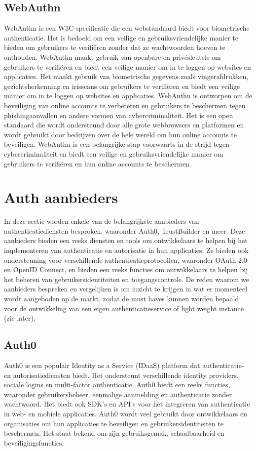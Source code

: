   \subsection{WebAuthn}%
  \label{subsec:webauthn}
  WebAuthn is een W3C-specificatie die een webstandaard biedt voor biometrische authenticatie. Het is bedoeld om een veilige en gebruiksvriendelijke manier te bieden om gebruikers te verifiëren zonder dat ze wachtwoorden hoeven te onthouden. WebAuthn maakt gebruik van openbare en privésleutels om gebruikers te verifiëren en biedt een veilige manier om in te loggen op websites en applicaties. Het maakt gebruik van biometrische gegevens zoals vingerafdrukken, gezichtsherkenning en irisscans om gebruikers te verifiëren en biedt een veilige manier om in te loggen op websites en applicaties. WebAuthn is ontworpen om de beveiliging van online accounts te verbeteren en gebruikers te beschermen tegen phishingaanvallen en andere vormen van cybercriminaliteit. Het is een open standaard die wordt ondersteund door alle grote webbrowsers en platformen en wordt gebruikt door bedrijven over de hele wereld om hun online accounts te beveiligen. WebAuthn is een belangrijke stap voorwaarts in de strijd tegen cybercriminaliteit en biedt een veilige en gebruiksvriendelijke manier om gebruikers te verifiëren en hun online accounts te beschermen.
  
  
  
  \section{Auth aanbieders}%
  \label{sec:auth-aanbieders}
  In deze sectie worden enkele van de belangrijkste aanbieders van authenticatiediensten besproken, waaronder Auth0, TrustBuilder en meer. Deze aanbieders bieden een reeks diensten en tools om ontwikkelaars te helpen bij het implementeren van authenticatie en autorisatie in hun applicaties. Ze bieden ook ondersteuning voor verschillende authenticatieprotocollen, waaronder OAuth 2.0 en OpenID Connect, en bieden een reeks functies om ontwikkelaars te helpen bij het beheren van gebruikersidentiteiten en toegangscontrole.
  De reden waarom we aanbieders bespreken en vergelijken is om inzicht te krijgen in wat er momenteel wordt aangeboden op de markt, zodat de must haves kunnen worden bepaald voor de ontwikkeling van een eigen authenticatieservice of light weight instance (zie later).
  
  
  \subsection{Auth0}%
  \label{subsec:auth0}
  Auth0 is een populair Identity as a Service (IDaaS) platform dat authenticatie- en autorisatiediensten biedt. Het ondersteunt verschillende identity providers, sociale logins en multi-factor authenticatie. Auth0 biedt een reeks functies, waaronder gebruikersbeheer, eenmalige aanmelding en authenticatie zonder wachtwoord. Het biedt ook SDK's en API's voor het integreren van authenticatie in web- en mobiele applicaties. Auth0 wordt veel gebruikt door ontwikkelaars en organisaties om hun applicaties te beveiligen en gebruikersidentiteiten te beschermen. Het staat bekend om zijn gebruiksgemak, schaalbaarheid en beveiligingsfuncties.

